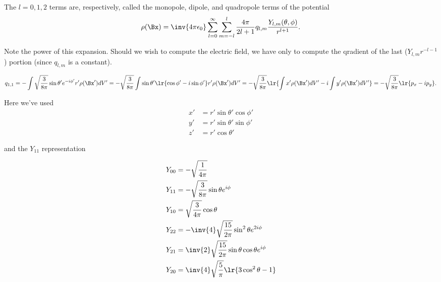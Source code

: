 The \( l = 0,1,2\) terms are, respectively, called the monopole, dipole, and quadropole terms of the potential
\begin{dmath}\label{eqn:emtLecture8:500}
\rho(\Bx) =
\inv{4 \pi \epsilon_0} 
\sum_{l= 0}^\infty \sum_{m = -l}^l \frac{4\pi} {2 l + 1} 
q_{l,m}
\frac{
Y_{l,m}(\theta, \phi)
}
{
r^{l+1}
}.
\end{dmath}

Note the power of this expansion.  Should we wish to compute the electric field, we have only to compute the qradient of  the last (\(Y_{l,m} r^{-l-1} \)) portion (since \( q_{l,m} \) is a constant).
 
\begin{dmath}\label{eqn:emtLecture8:520}
q_{1,1}
= 
-\int \sqrt{\frac{3}{8 \pi}} \sin\theta' e^{-i\phi'} r' \rho(\Bx') dV'
=
-\sqrt{\frac{3}{8 \pi}} \int \sin\theta' \lr{ \cos\phi' - i\sin\phi'} r' \rho(\Bx') dV'
=
-\sqrt{\frac{3}{8 \pi}} \lr{ 
\int x' \rho(\Bx') dV'
-i \int y' \rho(\Bx') dV'
}
=
-\sqrt{\frac{3}{8 \pi}} \lr{ 
p_x - i p_y
}.
\end{dmath}

Here we've used
\begin{dmath}\label{eqn:emtLecture8:540}
\begin{aligned}
x' &= r' \sin\theta' \cos\phi' \\
y' &= r' \sin\theta' \sin\phi' \\
z' &= r' \cos\theta'
\end{aligned}
\end{dmath}

and the \( Y_{11} \) representation

\begin{dmath}\label{eqn:emtLecture8:560}
\begin{aligned}
Y_{00} &= -\sqrt{\frac{1}{4 \pi}} \\
Y_{11} &= -\sqrt{\frac{3}{8 \pi}} \sin\theta e^{i\phi} \\
Y_{10} &=  \sqrt{\frac{3}{4 \pi}} \cos\theta  \\
Y_{22} &= -\inv{4} \sqrt{\frac{15}{2 \pi}} \sin^2\theta e^{2 i\phi} \\
Y_{21} &=  \inv{2} \sqrt{\frac{15}{2 \pi}} \sin\theta \cos\theta e^{i\phi} \\
Y_{20} &=  \inv{4} \sqrt{\frac{5}{\pi}} \lr{ 3 \cos^2\theta - 1 } \\
\end{aligned}
\end{dmath}


